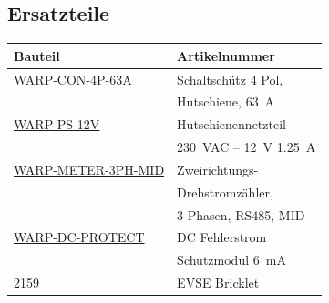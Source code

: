 \documentclass[a4paper,10pt]{article}
\begin{document}
\begin{multicols*}{2}
	\subsection{Ersatzteile}
	\begin{tabular}{ll}
		\toprule
		Bauteil                                                                                                                  & Artikelnummer                                         \\
		\midrule
		\href{https://www.tinkerforge.com/de/shop/warp/contactor-4-pole-din-rail-63a.html}{WARP-CON-4P-63A}                      & Schaltschütz 4 Pol,                                   \\
		                                                                                                                         & Hutschiene, \SI{63}{\ampere}                          \\
		\href{https://www.tinkerforge.com/de/shop/warp/din-rail-power-supply-230vac-12vdc-1-25a.html}{WARP-PS-12V}               & Hutschienennetzteil                                   \\
		                                                                                                                         & \SI{230}{\volt}AC – \SI{12}{\volt} \SI{1,25}{\ampere} \\
		\href{https://www.tinkerforge.com/de/shop/warp/bidirectional-polyphase-meter-3-phase-rs485-mid.html}{WARP-METER-3PH-MID} & Zweirichtungs-                                        \\
		                                                                                                                         & Drehstromzähler,                                      \\
		                                                                                                                         & 3 Phasen, RS485, MID                                  \\
		\href{https://www.tinkerforge.com/de/shop/warp/dc-residual-current-protection-module-6ma.html}{WARP-DC-PROTECT}          & DC Fehlerstrom                                        \\
		                                                                                                                         & Schutzmodul \SI{6}{\milli\ampere}                     \\
		2159                                                                                                                     & EVSE Bricklet                                         \\

\end{tabular}
\end{multicols*}
\end{document}

